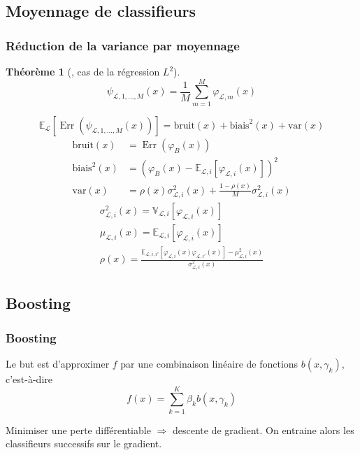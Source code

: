 \documentclass[dvipsnames,10pt]{beamer}
\theoremstyle{plain}
\newtheorem{theoreme}{Théorème}
\theoremstyle{definition}
\begin{document}
\subsection{Moyennage de classifieurs}

\begin{frame}
\frametitle{Réduction de la variance par moyennage}
\begin{theoreme}[\cite{Louppe2014}, cas de la régression $L^2$]
\begin{equation*}
    \psi_{\mathcal{L},1,\dotsc,M} (x) = \frac{1}{M} \sum_{m=1}^M \varphi_{\mathcal{L},m} (x)  
\end{equation*}
        
\begin{equation*}
    \mathbb{E}_{\mathcal{L}} \left[ \operatorname{Err}(\psi_{\mathcal{L},1,\dotsc,M} (x)) \right] = \mathrm{bruit}(x) + \mathrm{biais}^2 (x) + \mathrm{var} (x)
\end{equation*}
\begin{align*}
    \mathrm{bruit}(x) &= \operatorname{Err} ( \varphi_B (x) ) \\
    \mathrm{biais}^2 (x) &= \left( \varphi_B (x) - \mathbb{E}_{\mathcal{L},i} \left[ \varphi_{\mathcal{L},i} (x) \right] \right)^2 \\
    \mathrm{var} (x) &= \rho (x) \sigma^2_{\mathcal{L},i} (x) + \frac{1-\rho (x)}{M} \sigma^2_{\mathcal{L},i} (x) 
\end{align*}
\begin{gather*}
    \sigma^2_{\mathcal{L},i} (x) = \mathbb{V}_{\mathcal{L},i} [ \varphi_{\mathcal{L},i} (x)] \\
    \mu_{\mathcal{L},i} (x) = \mathbb{E}_{\mathcal{L},i} [ \varphi_{\mathcal{L},i} (x)] \\
    \rho (x) = \frac{\mathbb{E}_{\mathcal{L},i,i'} [ \varphi_{\mathcal{L},i} (x) \varphi_{\mathcal{L},i'} (x)] - \mu^2_{\mathcal{L},i} (x) }{\sigma^2_{\mathcal{L},i} (x)}
\end{gather*}
\end{theoreme}
\end{frame}

\subsection{Boosting}

\begin{frame}[fragile]
\frametitle{Boosting}
Le but est d'approximer $f$ par une combinaison linéaire de fonctions $b(x,\gamma_k)$, c'est-à-dire
\begin{equation*}
    f(x) = \sum_{k=1}^K \beta_k b(x,\gamma_k)
\end{equation*}

Minimiser une perte différentiable $\Rightarrow$ descente de gradient. On entraine alors les classifieurs successifs sur le gradient.
\end{frame}
\end{document}
